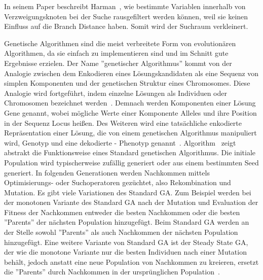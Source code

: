 \documentclass{article}
\begin{document}
In seinem Paper beschreibt Harman~\cite{Harman2002}, wie bestimmte Variablen innerhalb von Verzweigungsknoten bei der Suche rausgefiltert werden können, weil sie keinen Einfluss auf die Branch Distance haben. Somit wird der Suchraum verkleinert. 

Genetische Algorithmen sind die meist verbreitete Form von evolutionären Algorithmen, da sie einfach zu implementieren sind und im Schnitt gute Ergebnisse erzielen. Der Name ''genetischer Algorithmus'' kommt von der Analogie zwischen dem Enkodieren eines Lösungskandidaten als eine Sequenz von simplen Komponenten und der genetischen Struktur eines Chromosomes. Diese Analogie wird fortgeführt, indem einzelne Lösungen als Individuen oder Chromosomen bezeichnet werden~\cite{Campos2017}. Demnach werden Komponenten einer Lösung Gene genannt, wobei mögliche Werte einer Komponente Alleles und ihre Position in der Sequenz Locus heißen. Des Weiteren wird eine tatsächliche enkodierte Repräsentation einer Lösung, die von einem genetischen Algorithmus manipuliert wird, Genotyp und eine dekodierte - Phenotyp genannt~\cite{McMinn_2004}. Algorithm~ zeigt abstrakt die Funktionsweise eines Standard genetischen Algorithmus. Die initiale Population wird typischerweise zufällig generiert oder aus einem bestimmten Seed generiert. In folgenden Generationen werden Nachkommen mittels Optimisierungs- oder Suchoperatoren gezüchtet, also Rekombination und Mutation. Es gibt viele Variationen des Standard GA. Zum Beispiel werden bei der monotonen Variante des Standard GA nach der Mutation und Evaluation der Fitness der Nachkommen entweder die besten Nachkommen oder die besten ''Parents'' der nächsten Population hinzugefügt. Beim Standard GA werden an der Stelle sowohl ''Parents'' als auch Nachkommen der nächsten Population hinzugefügt. Eine weitere Variante von Standard GA ist der Steady State GA, der wie die monotone Variante nur die besten Individuen nach einer Mutation behält, jedoch anstatt eine neue Population von Nachkommen zu kreieren, ersetzt die ''Parents'' durch Nachkommen in der ursprünglichen Population~\cite{Campos2017}. 
\end{document}
